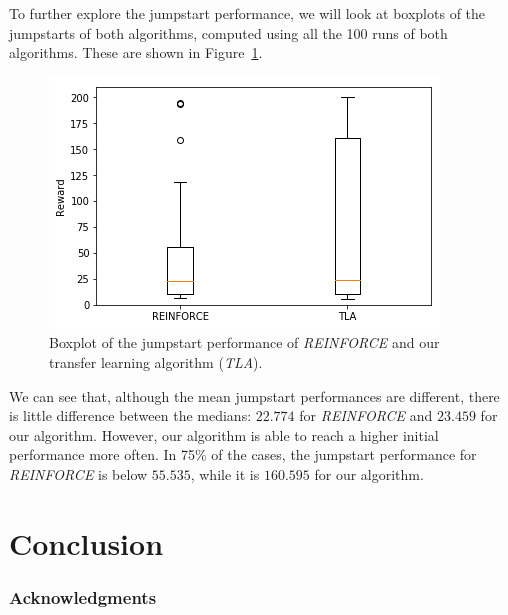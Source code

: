 \documentclass[a4paper, 11pt]{article}
\begin{document}
To further explore the jumpstart performance, we will look at boxplots of the jumpstarts of both algorithms, computed using all the 100 runs of both algorithms. These are shown in Figure~\ref{fig:boxplot_tla_re_5envs}.
\begin{figure}[H]
    \centering
    \includegraphics[width=.8\linewidth]{images/boxplot_tla_re_target_5envs.png}
    \caption{Boxplot of the jumpstart performance of \textit{REINFORCE} and our transfer learning algorithm (\textit{TLA}).}
    \label{fig:boxplot_tla_re_5envs}
\end{figure}
We can see that, although the mean jumpstart performances are different, there is little difference between the medians: $22.774$ for \textit{REINFORCE} and $23.459$ for our algorithm. However, our algorithm is able to reach a higher initial performance more often. In 75\% of the cases, the jumpstart performance for \textit{REINFORCE} is below $55.535$, while it is $160.595$ for our algorithm.

\section{Conclusion}
\subsubsection*{Acknowledgments}



\end{document}
